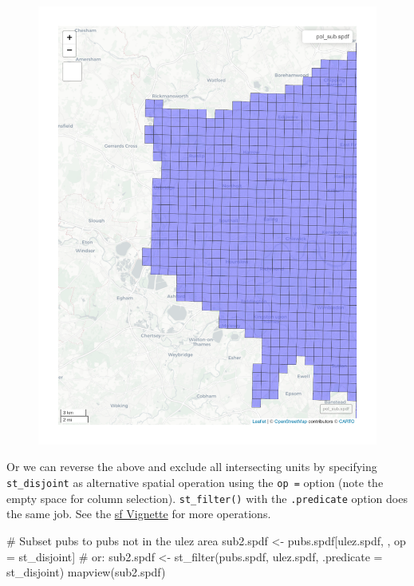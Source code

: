 \documentclass[
  letterpaper,
  DIV=11,
  numbers=noendperiod]{scrreprt}
\newenvironment{Shaded}{\begin{snugshade}}{\end{snugshade}}
\newcommand{\AttributeTok}[1]{\textcolor[rgb]{0.40,0.45,0.13}{#1}}
\newcommand{\CommentTok}[1]{\textcolor[rgb]{0.37,0.37,0.37}{#1}}
\newcommand{\FunctionTok}[1]{\textcolor[rgb]{0.28,0.35,0.67}{#1}}
\newcommand{\NormalTok}[1]{\textcolor[rgb]{0.00,0.23,0.31}{#1}}
\newcommand{\OtherTok}[1]{\textcolor[rgb]{0.00,0.23,0.31}{#1}}
\begin{document}
\begin{figure}[H]

{\centering \includegraphics{02_spatial-data_files/figure-pdf/unnamed-chunk-7-1.pdf}

}

\end{figure}

Or we can reverse the above and exclude all intersecting units by
specifying \texttt{st\_disjoint} as alternative spatial operation using
the \texttt{op\ =} option (note the empty space for column selection).
\texttt{st\_filter()} with the \texttt{.predicate} option does the same
job. See the
\href{https://cran.r-project.org/web/packages/sf/vignettes/sf3.html}{sf
Vignette} for more operations.

\begin{Shaded}
\begin{Highlighting}[]
\CommentTok{\# Subset pubs to pubs not in the ulez area}
\NormalTok{sub2.spdf }\OtherTok{\textless{}{-}}\NormalTok{ pubs.spdf[ulez.spdf, , op }\OtherTok{=}\NormalTok{ st\_disjoint] }\CommentTok{\# or:}
\NormalTok{sub2.spdf }\OtherTok{\textless{}{-}} \FunctionTok{st\_filter}\NormalTok{(pubs.spdf, ulez.spdf, }\AttributeTok{.predicate =}\NormalTok{ st\_disjoint)}
\FunctionTok{mapview}\NormalTok{(sub2.spdf)}
\end{Highlighting}
\end{Shaded}
\end{document}
